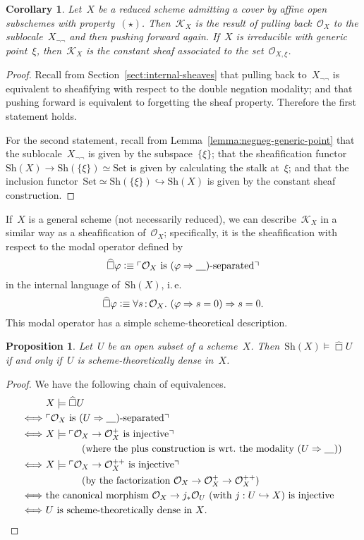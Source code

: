 \documentclass[10pt]{amsart}
\makeatletter
\theoremstyle{definition}
\theoremstyle{plain}
\newtheorem{prop}[defn]{Proposition}
\newtheorem{cor}[defn]{Corollary}
\theoremstyle{remark}
\renewcommand{\O}{\mathcal{O}}
\newcommand{\K}{\mathcal{K}}
\newcommand{\placeholder}{\underline{\quad}}
\newcommand{\Set}{\mathrm{Set}}
\newcommand{\Sh}{\mathrm{Sh}}
\newcommand{\?}{\,{:}\,}
\renewcommand{\_}{\mathpunct{.}\,}
\newcommand{\speak}[1]{\ulcorner\text{\textnormal{#1}}\urcorner}
\newcommand{\sdense}{{\widehat\Box}}
\newcommand{\ie}{i.\,e.\@\xspace}
\newcommand{\defequiv}{\vcentcolon\equiv}
\makeatother
\begin{document}
\begin{cor}Let~$X$ be a reduced scheme admitting a cover by affine open subschemes
with property~$(\star)$. Then~$\K_X$ is the result of
pulling back~$\O_X$ to the sublocale~$X_{\neg\neg}$ and then pushing forward
again. If~$X$ is irreducible with generic point~$\xi$, then~$\K_X$ is the
constant sheaf associated to the set~$\O_{X,\xi}$.\end{cor}
\begin{proof}Recall from Section~\ref{sect:internal-sheaves} that pulling back
to~$X_{\neg\neg}$ is equivalent to sheafifying with respect to the double
negation modality; and that pushing forward is equivalent to forgetting the
sheaf property. Therefore the first statement holds.

For the second statement, recall from Lemma~\ref{lemma:negneg-generic-point} that the
sublocale~$X_{\neg\neg}$ is given by the subspace~$\{\xi\}$; that the
sheafification functor~$\Sh(X) \to \Sh(\{\xi\}) \simeq \Set$ is given by
calculating the stalk at~$\xi$; and that the inclusion functor~$\Set \simeq
\Sh(\{\xi\}) \hookrightarrow \Sh(X)$ is given by the constant sheaf
construction.
\end{proof}

If~$X$ is a general scheme (not necessarily reduced),
we can describe~$\K_X$ in a similar way as a sheafification
of~$\O_X$; specifically, it is the sheafification with respect to the modal
operator defined by
\[ \sdense\varphi \defequiv \speak{$\O_X$ is~$(\varphi \Rightarrow
\placeholder)$-separated} \]
in the internal language of~$\Sh(X)$, \ie
\[ \sdense\varphi \defequiv \forall s\?\O_X\_ (\varphi \Rightarrow s = 0)
\Rightarrow s = 0. \]
This modal operator has a simple scheme-theoretical description.

\begin{prop}\label{lemma:scheme-theoretical-density}
Let~$U$ be an open subset of a scheme~$X$. Then~$\Sh(X) \models
\sdense U$ if and only if~$U$ is scheme-theoretically dense in~$X$.
\end{prop}
\begin{proof}We have the following chain of equivalences.
\begin{align*}
  &\ X \models \sdense U \\
  \Longleftrightarrow&\
    \speak{$\O_X$ is~$(U \Rightarrow \placeholder)$-separated} \\
  \Longleftrightarrow&\
    X \models \speak{$\O_X \to \O_X^{+}$ is injective} \\
  &\qquad\qquad\text{(where the plus construction is wrt.\@ the modality~$(U \Rightarrow \placeholder)$)} \\
  \Longleftrightarrow&\
    X \models \speak{$\O_X \to \O_X^{++}$ is injective} \\
  &\qquad\qquad\text{(by the factorization~$\O_X \to \O_X^{+} \to \O_X^{++}$)} \\
  \Longleftrightarrow&\
    \text{the canonical morphism~$\O_X \to j_* \O_U$
    (with $j : U \hookrightarrow X$) is injective} \\
  \Longleftrightarrow&\
    \text{$U$ is scheme-theoretically dense in~$X$.} \qedhere
\end{align*}
\end{proof}
\end{document}
